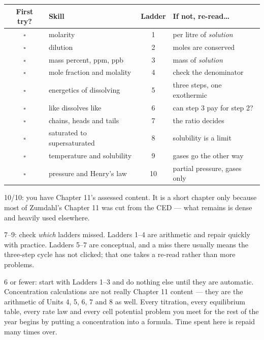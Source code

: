 \documentclass{apchem-worksheet}
\begin{document}
\renewcommand{\arraystretch}{1.3}
\noindent\begin{tabular}{@{}c p{5.9cm} c p{4.9cm}@{}}
\toprule
\textbf{First try?} & \textbf{Skill} & \textbf{Ladder} &
  \textbf{If not, re-read\ldots}\\
\midrule
$\square$ & molarity & 1 & per litre of \emph{solution} \\
$\square$ & dilution & 2 & moles are conserved \\
$\square$ & mass percent, ppm, ppb & 3 & mass of \emph{solution} \\
$\square$ & mole fraction and molality & 4 & check the denominator \\
$\square$ & energetics of dissolving & 5 & three steps, one exothermic \\
$\square$ & like dissolves like & 6 & can step 3 pay for step 2? \\
$\square$ & chains, heads and tails & 7 & the ratio decides \\
$\square$ & saturated to supersaturated & 8 & solubility is a limit \\
$\square$ & temperature and solubility & 9 & gases go the other way \\
$\square$ & pressure and Henry's law & 10 & partial pressure, gases only \\
\bottomrule
\end{tabular}

\begin{apcnote}
10/10: you have Chapter 11's assessed content. It is a short chapter
only because most of Zumdahl's Chapter 11 was cut from the CED --- what
remains is dense and heavily used elsewhere.

7--9: check \emph{which} ladders missed. Ladders 1--4 are arithmetic and
repair quickly with practice. Ladders 5--7 are conceptual, and a miss
there usually means the three-step cycle has not clicked; that one takes
a re-read rather than more problems.

6 or fewer: start with Ladders 1--3 and do nothing else until they are
automatic. Concentration calculations are not really Chapter 11 content
--- they are the arithmetic of Units 4, 5, 6, 7 and 8 as well. Every
titration, every equilibrium table, every rate law and every cell
potential problem you meet for the rest of the year begins by putting a
concentration into a formula. Time spent here is repaid many times over.
\end{apcnote}
\end{document}
